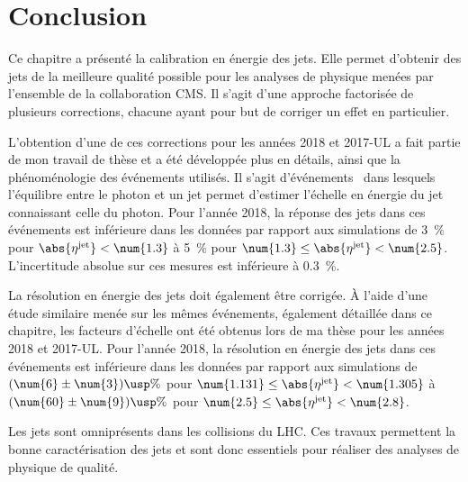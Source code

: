 \section{Conclusion}\label{chapter-JERC-section-conclusion}
Ce chapitre a présenté la calibration en énergie des jets.
Elle permet d'obtenir des jets de la meilleure qualité possible pour les analyses de physique menées par l'ensemble de la collaboration CMS.
Il s'agit d'une approche factorisée de plusieurs corrections, chacune ayant pour but de corriger un effet en particulier.
\par L'obtention d'une de ces corrections pour les années 2018 et 2017-UL a fait partie de mon travail de thèse et a été développée plus en détails, ainsi que la phénoménologie des événements utilisés.
Il s'agit d'événements \Gjets\ dans lesquels l'équilibre entre le photon et un jet permet d'estimer l'échelle en énergie du jet connaissant celle du photon.
Pour l'année 2018, la réponse des jets dans ces événements est inférieure dans les données par rapport aux simulations
de
\SI{3}{\%} pour $\abs{\eta^\text{jet}} < \num{1.3}$
à
\SI{5}{\%} pour $\num{1.3} \leq \abs{\eta^\text{jet}} < \num{2.5}$.
L'incertitude absolue sur ces mesures est inférieure à \SI{0.3}{\%}.
\par La résolution en énergie des jets doit également être corrigée.
À l'aide d'une étude similaire menée sur les mêmes événements, également détaillée dans ce chapitre, les facteurs d'échelle ont été obtenus lors de ma thèse pour les années 2018 et 2017-UL.
Pour l'année 2018, la résolution en énergie des jets dans ces événements est inférieure dans les données par rapport aux simulations
de
$(\num{6}\pm\num{3})\usp\%$ pour $\num{1.131} \leq \abs{\eta^\text{jet}} < \num{1.305}$
à
$(\num{60}\pm\num{9})\usp\%$ pour $\num{2.5} \leq \abs{\eta^\text{jet}} < \num{2.8}$.
\par Les jets sont omniprésents dans les collisions du LHC.
Ces travaux permettent la bonne caractérisation des jets et sont donc essentiels pour réaliser des analyses de physique de qualité.